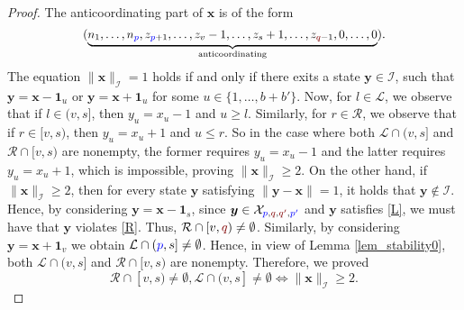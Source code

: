 \documentclass[10 pt,twocolumn,journal]{IEEEtran}
\theoremstyle{plain}
\newcommand{\I}{\mathcal{I}}
\newcommand{\X}{\mathcal{X}}
\newcommand{\R}{\mathcal{R}}
\renewcommand{\L}{\mathcal{L}}
\newcommand{\x}{\bm{x}}
\newcommand{\y}{\bm{y}}
\newcommand{\p}{\tb{p}}
\newcommand{\pp}{\tb{p'}}
\newcommand{\q}{\tr{q}}
\newcommand{\qq}{\tr{q'}}
\newcommand{\tb}{\textcolor{blue}}
\newcommand{\tr}{\textcolor{Myred}}
\theoremstyle{definition}
\begin{document}
\begin{proof}
    The anticoordinating part of $\x$ is of the form
    \begin{equation*}\scalebox{.95}{\text{$
        (\underbrace{n_1,\ldots,n_{\p},z_{\p+1},\ldots,
        z_v-1, \ldots, z_s+1,
        \ldots,z_{\q-1}, 0,\ldots,0}_{\text{anticoordinating}})$}}.
    \end{equation*} 
    The equation $\|\x\|_{\I} =1$ holds if and only if there exits a state $\y\in\I$, such that $\y=\x-\bm{1}_u$ or $\y=\x+\bm{1}_u$ for some $u\in\{1,\ldots,b+b'\}$.
    Now, for $l\in\L$,
    we observe that if $l\in(v,s]$, then $y_u = x_u-1$ and $ u\geq l $.
    Similarly, for $r\in\R$,
    we observe that if $r\in[v,s)$, then $y_u = x_u+1 $ and $ u\leq r $.
    So in the case where both $\L\cap(v,s]$ and $\R\cap[v,s)$ are nonempty, the former requires $y_u=x_u-1$ and the latter requires $y_u=x_u+1$, which is impossible, proving $\|\x\|_{\I} \geq 2$.
    On the other hand, if $\|\x\|_{\I} \geq 2$, then for every state $\y$ satisfying $\|\y-\x\|=1$, it holds that $\y\not\in\I$.
    Hence, by considering $\y = \x - \bm{1}_s$, since $\y\in\X_{\p,\q,\qq,\pp}$ and $\y$ satisfies \eqref{L}, we must have that $\y$ violates \eqref{R}.
    Thus, $\R\cap[v,\q)\neq\emptyset$.
    Similarly, by considering $\y = \x + \bm{1}_v$ we obtain $\L\cap(\p,s]\neq\emptyset$.
    Hence, in view of Lemma \ref{lem_stability0}, both $\L\cap(v,s]$ and $\R\cap[v,s)$ are nonempty.
    Therefore, we proved
    \begin{equation}    \label{lem_stability_1}
        \R\cap[v,s) \neq \emptyset,\L\cap(v,s] \neq \emptyset
        \iff
        \|\x\|_{\I} \geq 2.
    \end{equation}
    

\end{proof}
\end{document}

